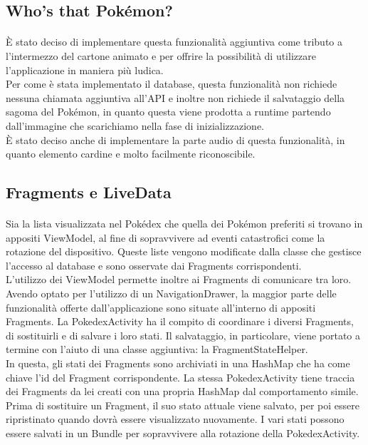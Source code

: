 \documentclass[a4paper,11pt]{article}
\begin{document}
				\subsection{Who's that Pokémon?}
					\paragraph{}
						È stato deciso di implementare questa funzionalità aggiuntiva come tributo a l’intermezzo del cartone animato e per offrire la possibilità di utilizzare l’applicazione in maniera più ludica.\\
						Per come è stata implementato il database, questa funzionalità non richiede nessuna chiamata aggiuntiva all’API e inoltre non richiede il salvataggio della sagoma del Pokémon, in quanto questa viene prodotta a runtime partendo dall’immagine che scarichiamo nella fase di inizializzazione.\\
						È stato deciso anche di implementare la parte audio di questa funzionalità, in quanto elemento cardine e molto facilmente riconoscibile.\\
				\subsection{Fragments e LiveData}
					\paragraph{}
						Sia la lista visualizzata nel Pokédex che quella dei Pokémon preferiti si trovano in appositi ViewModel, al fine di sopravvivere ad eventi catastrofici come la rotazione del dispositivo. Queste liste vengono modificate dalla classe che gestisce l’accesso al database e sono osservate dai Fragments corrispondenti.\\
						L’utilizzo dei ViewModel permette inoltre ai Fragments di comunicare tra loro.\\
						Avendo optato per l’utilizzo di un NavigationDrawer, la maggior parte delle funzionalità offerte dall’applicazione sono situate all’interno di appositi Fragments. La PokedexActivity ha il compito di coordinare i diversi Fragments, di sostituirli e di salvare i loro stati. Il salvataggio, in particolare, viene portato a termine con l’aiuto di una classe aggiuntiva: la FragmentStateHelper.\\
						In questa, gli stati dei Fragments sono archiviati in una HashMap che ha come chiave l’id del Fragment corrispondente. La stessa PokedexActivity tiene traccia dei Fragments da lei creati con una propria HashMap dal comportamento simile. Prima di sostituire un Fragment, il suo stato attuale viene salvato, per poi essere ripristinato quando dovrà essere visualizzato nuovamente. I vari stati possono essere salvati in un Bundle per sopravvivere alla rotazione della PokedexActivity.\\
				\newpage

				
  						
\end{document}
